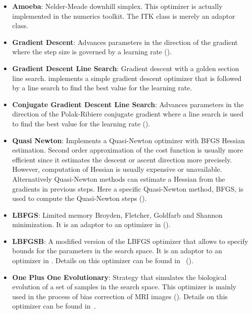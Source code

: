 \begin{itemize}

\item \textbf{Amoeba}: Nelder-Meade downhill simplex.  This optimizer is
actually implemented in the  numerics toolkit.  The ITK class
 is merely an adaptor class.

\item \textbf{Gradient Descent}: Advances parameters in the direction of the
gradient where the step size is governed by a learning rate
().

\item \textbf{Gradient Descent Line Search}: Gradient descent with a golden
section line search.  implements
a simple gradient descent optimizer that is followed by a line search to find
the best value for the learning rate.

\item \textbf{Conjugate Gradient Descent Line Search}: Advances parameters in
the direction of the Polak-Ribiere conjugate gradient where a line search is
used to find the best value for the learning rate
().

\item \textbf{Quasi Newton}: Implements a Quasi-Newton optimizer with BFGS
Hessian estimation. Second order approximation of the cost function is usually
more efficient since it estimates the descent or ascent direction more precisely.
However, computation of Hessian is usually expensive or unavailable. Alternatively
Quasi-Newton methods can estimate a Hessian from the gradients in previous steps.
Here a specific Quasi-Newton method, BFGS, is used to compute the Quasi-Newton steps
().

\item \textbf{LBFGS}: Limited memory Broyden, Fletcher, Goldfarb
and Shannon minimization. It is an adaptor to an optimizer in 
().

\item \textbf{LBFGSB}: A modified version of the LBFGS optimizer that allows to
specify bounds for the parameters in the search space.  It is an adaptor to an
optimizer in . Details on this optimizer can be found
in~\cite{Byrd1995,Zhu1997} ().

\item \textbf{One Plus One Evolutionary}: Strategy that simulates the
biological evolution of a set of samples in the search space. This optimizer is
mainly used in the process of bias correction of MRI images
(). Details on this optimizer can be
found in~\cite{Styner2000}.


\end{itemize}

